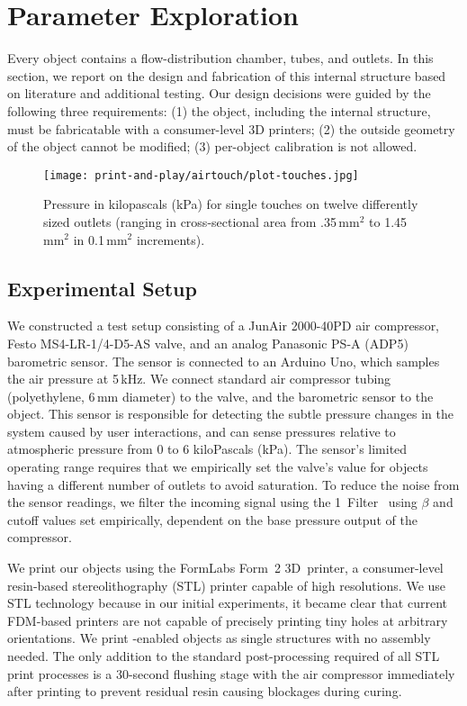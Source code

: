     \section{Parameter Exploration}
			Every \at object contains a flow-distribution chamber, tubes, and outlets.
			In this section, we report on the design and fabrication of this internal
			structure based on literature and additional testing. Our design decisions
			were guided by the following three requirements: (1) the object, including
			the internal structure, must be fabricatable with a consumer-level 3D
			printers; (2) the outside geometry of the object cannot be modified; (3)
			per-object calibration is not allowed.

			\begin{figure}
				\centering
					\texttt{[image: print-and-play/airtouch/plot-touches.jpg]}
					\caption{Pressure in kilopascals (kPa) for single touches on twelve
						differently sized outlets (ranging in cross-sectional area from
						.35\,mm$^2$ to 1.45\,mm$^2$ in 0.1\,mm$^2$ increments).}
					\label{fig:bar-touches}
			\end{figure}

			\subsection{Experimental Setup}
				We constructed a test setup consisting of a JunAir 2000-40PD air
				compressor, Festo MS4-LR-1/4-D5-AS valve, and an analog Panasonic PS-A
				(ADP5) barometric sensor. The sensor is connected to an Arduino Uno,
				which samples the air pressure at 5\,kHz. We connect standard air
				compressor tubing (polyethylene, 6\,mm diameter) to the valve, and the
				barometric sensor to the object. This sensor is responsible for
				detecting the subtle pressure changes in the system caused by user
				interactions, and can sense pressures relative to atmospheric pressure
				from 0 to 6 kiloPascals (kPa). The sensor's limited operating range
				requires that we empirically set the valve's value for objects having a
				different number of outlets to avoid saturation. To reduce the noise
				from the sensor readings, we filter the incoming signal using the
				1\texteuro~Filter~\cite{Casiez:2012} using $\beta$ and cutoff values
				set empirically, dependent on the base pressure output of the
				compressor.
					
				We print our objects using the FormLabs Form~2 3D~printer, a
				consumer-level resin-based stereolithography (STL) printer capable of
				high resolutions. We use STL technology because in our initial
				experiments, it became clear that current FDM-based printers are not
				capable of precisely printing tiny holes at arbitrary orientations. We
				print \at-enabled objects as single structures with no assembly needed.
				The only addition to the standard post-processing required of all STL
				print processes is a 30-second flushing stage with the air compressor
				immediately after printing to prevent residual resin causing blockages
				during curing.

